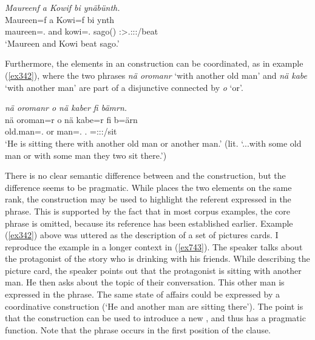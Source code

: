 \begin{exe}
	\ex \emph{Maureenf a Kowif bi ynäbünth.}\\
	\gll Maureen=f a Kowi=f bi ynth\\
	maureen=\Erg.{\Sg} and kowi=\Erg.{\Sg} sago(\Abs) \Stdu:\Sbj>\Tsg.\Masc:\Obj:\Nonpast:\Ipfv/beat\\
	\trans `Maureen and Kowi beat sago.'
	\label{ex726}
\end{exe}

Furthermore, the elements in an  construction can be coordinated, as in example (\ref{ex342}), where the two  phrases \emph{nä oromanr} `with another old man' and \emph{nä kabe} `with another man' are part of a disjunctive  connected by \emph{o} `or'.

\begin{exe}
	\ex \emph{nä oromanr o nä kaber fi bämrn.}\\
	\gll nä {oroman=r} o nä kabe=r fi b=ärn\\
	{\Indf} {old.man=\Assoc.\Du} or {\Indf} man=\Assoc.{\Du} \Third.{\Abs} \Med=\Stdu:\Sbj:\Nonpast:\Ipfv/sit\\
	\trans `He is sitting there with another old man or another man.' (lit. `...with some old man or with some man they two sit there.')
	\label{ex342}
\end{exe}

There is no clear semantic difference between  and the  construction, but the difference seems to be pragmatic. While  places the two elements on the same rank, the  construction may be used to highlight the referent expressed in the  phrase. This is supported by the fact that in most corpus examples, the core phrase is omitted, because its reference has been established earlier. Example (\ref{ex342}) above was uttered as the description of a set of pictures cards. I reproduce the example in a longer context in (\ref{ex743}). The speaker talks about the protagonist of the story who is drinking with his friends. While describing the picture card, the speaker points out that the protagonist is sitting with another man. He then asks about the topic of their conversation. This other man is expressed in the  phrase. The same state of affairs could be expressed by a coordinative construction (`He and another man are sitting there'). The point is that the  construction can be used to introduce a new , and thus has a pragmatic function. Note that the  phrase occurs in the first position of the clause.

